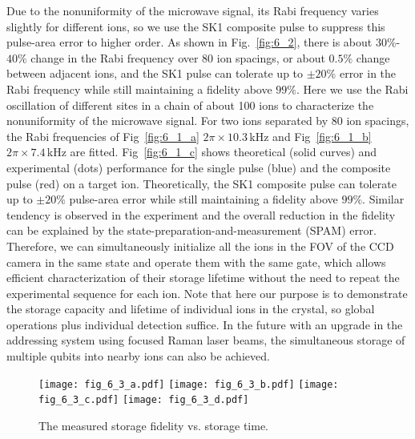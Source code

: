 Due to the nonuniformity of the microwave signal, its Rabi frequency varies slightly for different ions, so we use the SK1 composite pulse \cite{brown2004arbitrarily, bando2012concatenated} to suppress this pulse-area error to higher order. As shown in Fig.~\ref{fig:6_2}, there is about $30\%$-$40\%$ change in the Rabi frequency over 80 ion spacings, or about $0.5\%$ change between adjacent ions, and the SK1 pulse can tolerate up to $\pm20\%$ error in the Rabi frequency while still maintaining a fidelity above $99\%$. Here we use the Rabi oscillation of different sites in a chain of about 100 ions to characterize the nonuniformity of the microwave signal. For two ions separated by 80 ion spacings, the Rabi frequencies of Fig~\ref{fig:6_1_a} $2\pi\times 10.3\,$kHz and Fig~\ref{fig:6_1_b} $2\pi\times 7.4\,$kHz are fitted. Fig~\ref{fig:6_1_c} shows theoretical (solid curves) and experimental (dots) performance for the single pulse (blue) and the composite pulse (red) on a target ion. Theoretically, the SK1 composite pulse can tolerate up to $\pm 20\%$ pulse-area error while still maintaining a fidelity above $99\%$. Similar tendency is observed in the experiment and the overall reduction in the fidelity can be explained by the state-preparation-and-measurement (SPAM) error. Therefore, we can simultaneously initialize all the ions in the FOV of the CCD camera in the same state and operate them with the same gate, which allows efficient characterization of their storage lifetime without the need to repeat the experimental sequence for each ion. Note that here our purpose is to demonstrate the storage capacity and lifetime of individual ions in the crystal, so global operations plus individual detection suffice. In the future with an upgrade in the addressing system using focused Raman laser beams, the simultaneous storage of multiple qubits into nearby ions can also be achieved.

\begin{figure}
    \centering
    {\texttt{[image: fig\_6\_3\_a.pdf]}}
    {\texttt{[image: fig\_6\_3\_b.pdf]}}
    {\texttt{[image: fig\_6\_3\_c.pdf]}}
    {\texttt{[image: fig\_6\_3\_d.pdf]}}
    \caption{The measured storage fidelity vs. storage time.}
    \label{fig:6_3}
\end{figure}

